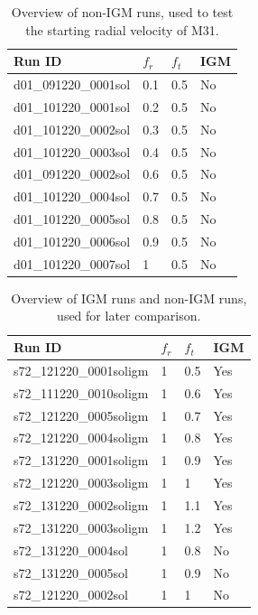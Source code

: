 \documentclass[a4paper,12pt, english]{article}
\begin{document}
\begin{table}[!h]
\centering
\begin{tabular}{@{}l|l|l|l@{}}
\toprule
Run ID               & \(f_{r}\) & \(f_{t}\) & IGM \\ \midrule
d01\_091220\_0001sol & 0.1       & 0.5       & No  \\
d01\_101220\_0001sol & 0.2       & 0.5       & No  \\
d01\_101220\_0002sol & 0.3       & 0.5       & No  \\
d01\_101220\_0003sol & 0.4       & 0.5       & No  \\
d01\_091220\_0002sol & 0.6       & 0.5       & No  \\
d01\_101220\_0004sol & 0.7       & 0.5       & No  \\
d01\_101220\_0005sol & 0.8       & 0.5       & No  \\
d01\_101220\_0006sol & 0.9       & 0.5       & No  \\
d01\_101220\_0007sol & 1         & 0.5       & No  \\ \bottomrule
\end{tabular}
\caption{Overview of non-IGM runs, used to test the starting radial velocity of M31.}
\label{const-transvel-runs}
\end{table}
\newpage

\begin{table}[!h]
\centering
\begin{tabular}{@{}l|l|l|l@{}}
\toprule
Run ID                  & \(f_{r}\) & \(f_{t}\) & IGM \\ \midrule
s72\_121220\_0001soligm & 1         & 0.5       & Yes \\
s72\_111220\_0010soligm & 1         & 0.6       & Yes \\
s72\_121220\_0005soligm & 1         & 0.7       & Yes \\
s72\_121220\_0004soligm & 1         & 0.8       & Yes \\
s72\_131220\_0001soligm & 1         & 0.9       & Yes \\
s72\_121220\_0003soligm & 1         & 1         & Yes \\
s72\_131220\_0002soligm & 1         & 1.1       & Yes \\
s72\_131220\_0003soligm & 1         & 1.2       & Yes \\
s72\_131220\_0004sol    & 1         & 0.8       & No  \\
s72\_131220\_0005sol    & 1         & 0.9       & No  \\
s72\_121220\_0002sol    & 1         & 1         & No  \\ \bottomrule
\end{tabular}
\caption{Overview of IGM runs and non-IGM runs, used for later comparison.}
\label{full-runs}
\end{table}
\smallskip
\end{document}
